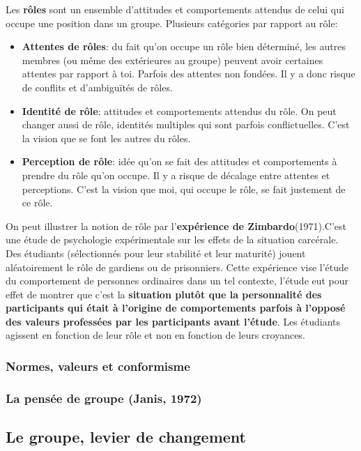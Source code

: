 \documentclass[12pt]{article}
\begin{document}
		Les \textbf{rôles} sont un ensemble d'attitudes et comportements attendus de celui qui occupe une position dans un groupe. \newline 
		Plusieurs catégories par rapport au rôle:
		\begin{itemize}
		\item \textbf{Attentes de rôles}: du fait qu'on occupe un rôle bien déterminé, les autres membres (ou même des extérieures au groupe) peuvent avoir certaines attentes par rapport à toi. Parfois des attentes non fondées. Il y a donc risque de conflits et d'ambiguïtés de rôles.
		\item \textbf{Identité de rôle}: attitudes et comportements attendus du rôle. On peut changer aussi de rôle, identités multiples qui sont parfois conflictuelles. C'est la vision que se font les autres du rôles.
		\item \textbf{Perception de rôle}: idée qu'on se fait des attitudes et comportements à prendre du rôle qu'on occupe. Il y a risque de décalage entre attentes et perceptions. C'est la vision que moi, qui occupe le rôle, se fait justement de ce rôle. \newline
		\end{itemize}
		
		On peut illustrer la notion de rôle par l'\textbf{expérience de Zimbardo}(1971).C'est une étude  de  psychologie  expérimentale  sur  les  effets  de  la  situation  carcérale. Des  étudiants 
(sélectionnés  pour  leur  stabilité  et  leur  maturité) jouent  aléatoirement  le  rôle  de  gardiens  ou  de 
prisonniers. Cette expérience vise l’étude du comportement de personnes ordinaires dans un tel contexte, l’étude 
eut pour effet de montrer que c’est la \textbf{situation plutôt que la personnalité des participants qui était 
à l’origine de comportements parfois à l’opposé des valeurs professées par les participants avant 
l’étude}. Les étudiants agissent en fonction de leur rôle et non en fonction de leurs croyances. 
		
		\subsubsection{Normes, valeurs et conformisme}
		\subsubsection{La pensée de groupe (Janis, 1972)}
	\subsection{Le groupe, levier de changement}
\end{document}
